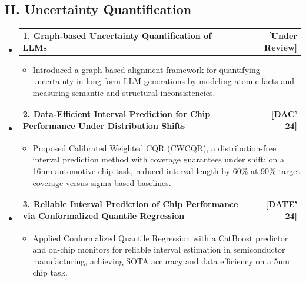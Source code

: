 \documentclass[letterpaper,11pt]{article}
\makeatletter
\newcommand{\resumeItem}[1]{
  \item\small{
    {#1 \vspace{-2pt}}
  }
}
\newcommand{\resumeSubheadingTwo}[2]{
  \vspace{-2pt}\item
    \begin{tabular*}{1\textwidth}[t]{l@{\extracolsep{\fill}}r}
      \textbf{#1} & \textbf{[#2]} \\
    \end{tabular*}\vspace{-7pt}
}
\newcommand{\resumeSubHeadingListStart}{\begin{itemize}[leftmargin=0.0in, label={}]}
\newcommand{\resumeSubHeadingListEnd}{\end{itemize}}
\newcommand{\resumeItemListStart}{\begin{itemize}}
\newcommand{\resumeItemListEnd}{\end{itemize}\vspace{-3pt}}
\makeatother
\begin{document}
\subsection*{II. Uncertainty Quantification}
  \resumeSubHeadingListStart
    \resumeSubheadingTwo
      {1. Graph-based Uncertainty Quantification of LLMs}{Under Review}
      \resumeItemListStart
        \resumeItem{Introduced a graph-based alignment framework for quantifying uncertainty in long-form LLM generations by modeling atomic facts and measuring semantic and structural inconsistencies.}
      \resumeItemListEnd
    \resumeSubheadingTwo
      {2. Data-Efficient Interval Prediction for Chip Performance Under Distribution Shifts}{DAC' 24}
      \resumeItemListStart
        \resumeItem{Proposed Calibrated Weighted CQR (CWCQR), a distribution-free interval prediction method with coverage guarantees under shift; on a 16nm automotive chip task, reduced interval length by 60\% at 90\% target coverage versus sigma-based baselines.}
      \resumeItemListEnd
    \resumeSubheadingTwo
      {3. Reliable Interval Prediction of Chip Performance via Conformalized Quantile Regression}{DATE' 24}
      \resumeItemListStart
        \resumeItem{Applied Conformalized Quantile Regression with a CatBoost predictor and on-chip monitors for reliable interval estimation in semiconductor manufacturing, achieving SOTA accuracy and data efficiency on a 5nm chip task.}
      \resumeItemListEnd
  \resumeSubHeadingListEnd

\end{document}

